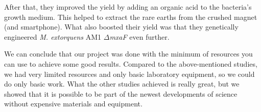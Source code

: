 After that, they improved the yield by adding an organic acid to the bacteria's growth medium.
This helped to extract the rare earths from the crushed magnet (and smartphone).
What also boosted their yield was that they genetically engineered \emph{M. extorquens} AM1 \(\Delta\)\emph{mxaF} even further.

We can conclude that our project was done with the minimum of resources you can use to achieve some good results.
Compared to the above-mentioned studies, we had very limited resources and only basic laboratory equipment, so we could do only basic work.
What the other studies achieved is really great, but we showed that it is possible to be part of the newest developments of science without expensive materials and equipment.